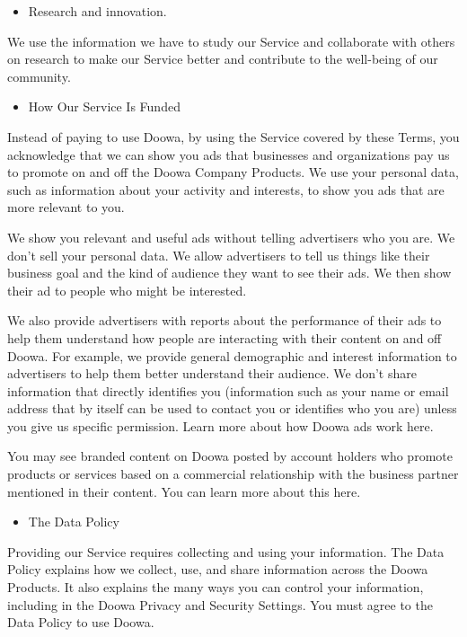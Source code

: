 \documentclass[conference]{IEEEtran}
\begin{document}
\begin{itemize}
\item Research and innovation.
\end{itemize}

We use the information we have to study our Service and collaborate with others on research to make our Service better and contribute to the well-being of our community.

\begin{itemize}
\item How Our Service Is Funded

\end{itemize}
Instead of paying to use Doowa, by using the Service covered by these Terms, you acknowledge that we can show you ads that businesses and organizations pay us to promote on and off the Doowa Company Products. We use your personal data, such as information about your activity and interests, to show you ads that are more relevant to you.

We show you relevant and useful ads without telling advertisers who you are. We don’t sell your personal data. We allow advertisers to tell us things like their business goal and the kind of audience they want to see their ads. We then show their ad to people who might be interested.

We also provide advertisers with reports about the performance of their ads to help them understand how people are interacting with their content on and off Doowa. For example, we provide general demographic and interest information to advertisers to help them better understand their audience. We don’t share information that directly identifies you (information such as your name or email address that by itself can be used to contact you or identifies who you are) unless you give us specific permission. Learn more about how Doowa ads work here.

You may see branded content on Doowa posted by account holders who promote products or services based on a commercial relationship with the business partner mentioned in their content. You can learn more about this here.

\begin{itemize}
\item The Data Policy

\end{itemize}
Providing our Service requires collecting and using your information. The Data Policy explains how we collect, use, and share information across the Doowa Products. It also explains the many ways you can control your information, including in the Doowa Privacy and Security Settings. You must agree to the Data Policy to use Doowa.
\end{document}
